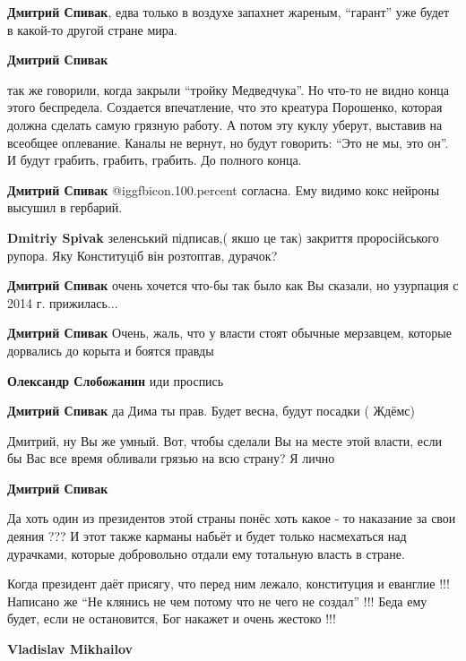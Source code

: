 \begin{itemize}
\begin{itemize}
\textbf{Дмитрий Спивак}, едва только в воздухе запахнет жареным, \enquote{гарант} уже будет в какой-то другой стране мира.

\textbf{Дмитрий Спивак} 

так же говорили, когда закрыли \enquote{тройку Медведчука}. Но что-то не видно конца
этого беспредела. Создается впечатление, что это креатура Порошенко, которая
должна сделать самую грязную работу. А потом эту куклу уберут, выставив на
всеобщее оплевание. Каналы не вернут, но будут говорить: \enquote{Это не мы, это он}. И
будут грабить, грабить, грабить. До полного конца.

\textbf{Дмитрий Спивак}  @igg{fbicon.100.percent}  согласна.
Ему видимо кокс нейроны высушил в гербарий.

\textbf{Dmitriy Spivak} зеленський підписав,( якшо це так) закриття проросійського рупора. Яку Конституціб він розтоптав, дурачок?

\textbf{Дмитрий Спивак} очень хочется что-бы так было как Вы сказали, но узурпация с 2014 г. прижилась...

\textbf{Дмитрий Спивак} Очень, жаль, что у власти стоят обычные мерзавцем, которые дорвались до корыта и боятся правды

\textbf{Олександр Слобожанин} иди проспись

\textbf{Дмитрий Спивак} да Дима ты прав. Будет весна, будут посадки ( Ждёмс)

Дмитрий, ну Вы же умный. Вот, чтобы сделали Вы на месте этой власти, если бы Вас все время обливали грязью на всю страну? Я лично

\textbf{Дмитрий Спивак} 

Да хоть один из президентов этой страны понёс хоть какое - то наказание за свои
деяния ??? И этот также карманы набьёт и будет только насмехаться над
дурачками, которые добровольно отдали ему тотальную власть в стране.


Когда президент даёт присягу, что перед ним лежало, конституция и еванглие
!!! Написано же \enquote{Не клянись не чем потому что не чего не создал} !!! Беда ему
будет, если не остановится, Бог накажет и очень жестоко !!!

\textbf{Vladislav Mikhailov} 


\end{itemize}
\end{itemize}
